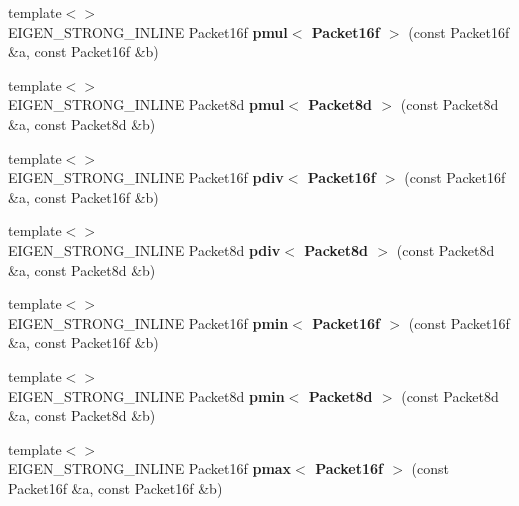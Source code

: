 \begin{DoxyCompactItemize}
{\footnotesize template$<$$>$ }\\E\+I\+G\+E\+N\+\_\+\+S\+T\+R\+O\+N\+G\+\_\+\+I\+N\+L\+I\+NE Packet16f {\bfseries pmul$<$ Packet16f $>$} (const Packet16f \&a, const Packet16f \&b)
\item 
\mbox{\label{namespace_eigen_1_1internal_a14f3341cfe428a018c137a692020741e}} 
{\footnotesize template$<$$>$ }\\E\+I\+G\+E\+N\+\_\+\+S\+T\+R\+O\+N\+G\+\_\+\+I\+N\+L\+I\+NE Packet8d {\bfseries pmul$<$ Packet8d $>$} (const Packet8d \&a, const Packet8d \&b)
\item 
\mbox{\label{namespace_eigen_1_1internal_a99574d474e52b0e439a26434ca290849}} 
{\footnotesize template$<$$>$ }\\E\+I\+G\+E\+N\+\_\+\+S\+T\+R\+O\+N\+G\+\_\+\+I\+N\+L\+I\+NE Packet16f {\bfseries pdiv$<$ Packet16f $>$} (const Packet16f \&a, const Packet16f \&b)
\item 
\mbox{\label{namespace_eigen_1_1internal_a993556e0ac60c0f7f7d08d574f41b8a0}} 
{\footnotesize template$<$$>$ }\\E\+I\+G\+E\+N\+\_\+\+S\+T\+R\+O\+N\+G\+\_\+\+I\+N\+L\+I\+NE Packet8d {\bfseries pdiv$<$ Packet8d $>$} (const Packet8d \&a, const Packet8d \&b)
\item 
\mbox{\label{namespace_eigen_1_1internal_ae183dcb768aaa07ed1df5b2297975039}} 
{\footnotesize template$<$$>$ }\\E\+I\+G\+E\+N\+\_\+\+S\+T\+R\+O\+N\+G\+\_\+\+I\+N\+L\+I\+NE Packet16f {\bfseries pmin$<$ Packet16f $>$} (const Packet16f \&a, const Packet16f \&b)
\item 
\mbox{\label{namespace_eigen_1_1internal_af56a8ae3350ab119e541a02caba64e29}} 
{\footnotesize template$<$$>$ }\\E\+I\+G\+E\+N\+\_\+\+S\+T\+R\+O\+N\+G\+\_\+\+I\+N\+L\+I\+NE Packet8d {\bfseries pmin$<$ Packet8d $>$} (const Packet8d \&a, const Packet8d \&b)
\item 
\mbox{\label{namespace_eigen_1_1internal_a76c434287ac1f22f8b22af2c39b3449f}} 
{\footnotesize template$<$$>$ }\\E\+I\+G\+E\+N\+\_\+\+S\+T\+R\+O\+N\+G\+\_\+\+I\+N\+L\+I\+NE Packet16f {\bfseries pmax$<$ Packet16f $>$} (const Packet16f \&a, const Packet16f \&b)

\end{DoxyCompactItemize}
